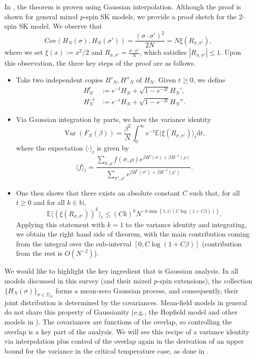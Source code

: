 \documentclass[11pt]{article}
\numberwithin{equation}{section}
\DeclareMathOperator{\Var}{Var}
\newcommand{\beq}{ \begin{equation} }
\newcommand{\eeq}{ \end{equation} }
\newcommand{\ip}[1]{\langle {#1} \rangle }
\def \dd {\mathrm{d}}
\def \b {\beta}
\def \s {\sigma}
\def \r {\rho}
\newcommand{\bN}{\mathbb{N}}
\newcommand{\bE}{\mathbb{E}}
\theoremstyle{remark}
\begin{document}
In \cite{Chatterjee09}, the theorem is proven using Gaussian interpolation. Although the proof is shown for general mixed $p$-spin SK models, we provide a proof sketch for the 2-spin SK model. We observe that
    \[
    \mathrm{Cov}(H_N(\s), H_N(\s')) = \frac{(\s\cdot \s')^2}{2N} =N\xi(R_{\s,\s'}), 
    \]
    where we set $\xi(x):= x^2/2$ and $R_{\s,\s'} = \frac{\s\cdot \s'}{N}$, which satisfies $|R_{\s,\s'}| \leq 1$. 
Upon this observation, the three key steps of the proof are as follows.
\begin{itemize}
    \item Take two independent copies $H'_N, H''_N$ of $H_N$. Given $t\geq 0$, we define
    \begin{align*}
        H^t_N &:= e^{-t}H_N + \sqrt{1-e^{-2t}}H_N',\\
        H^{-t}_N &:= e^{-t}H_N + \sqrt{1-e^{-2t}}H_N''.
    \end{align*}
    \item Via Gaussian integration by parts, we have the variance identity
    \beq\label{eq:varid_chatterjee}
    \Var(F_N(\b)) =\frac{\b^2}{N} \int_0^\infty e^{-t} \bE \ip{\xi(R_{\s,\s'})}_{t} \dd t,
    \eeq
    where the expectation $\ip{\cdot}_t$ is given by
    \[
    \ip{f}_t = \frac{\sum_{\s, \r}f(\s,\r) e^{\b H^t(\s)+\b H^{-t}(\r)}}{\sum_{\s', \r'} e^{\b H^t(\s')+\b H^{-t}(\r')}}.
    \]
    \item One then shows that there exists an absolute constant $C$ such that, for all $t\geq 0$ and for all $k \in \bN$, 
    \[
    \bE\ip{(\xi(R_{\s,\s'}))^k}_{t} \leq (Ck)^k N^{-k \min \left\{1, t/\left(C\log(1+C\b)\right)\right\}}.
    \]
    Applying this statement with $k=1$ to the variance identity and integrating, we obtain the right hand side of theorem, with the main contribution coming from the integral over the sub-interval $[0, C\log(1+C\b)]$ (contribution from the rest is $O(N^{-2})$). 
\end{itemize}

We would like to highlight the key ingredient that is Gaussian analysis. In all models discussed in this survey (and their mixed $p$-spin extensions), the collection $\{H_N(\s)\}_{\s \in \Sigma_N}$ forms a mean-zero Gaussian process, and consequently, their joint distribution is determined by the covariances. Mean-field models in general do not share this property of Gaussianity (e.g., the Hopfield model \cite{Hopfield} and other models in \cite{Talagrandvol1}). The covariances are functions of the overlap, so controlling the overlap is a key part of the analysis. We will see this recipe of a variance identity via interpolation plus control of the overlap again in the derivation of an upper bound for the variance in the critical temperature case, as done in \cite{ChenLam19}.
\end{document}
